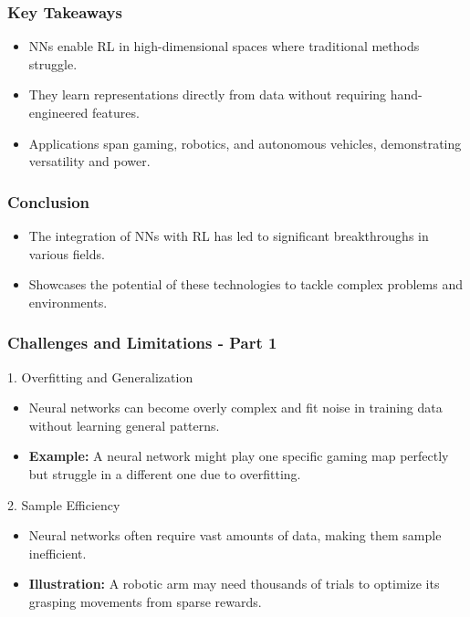 \documentclass[aspectratio=169]{beamer}
\begin{document}
\begin{frame}
    \frametitle{Key Takeaways}
    \begin{itemize}
        \item NNs enable RL in high-dimensional spaces where traditional methods struggle.
        \item They learn representations directly from data without requiring hand-engineered features.
        \item Applications span gaming, robotics, and autonomous vehicles, demonstrating versatility and power.
    \end{itemize}
\end{frame}

\begin{frame}
    \frametitle{Conclusion}
    \begin{itemize}
        \item The integration of NNs with RL has led to significant breakthroughs in various fields.
        \item Showcases the potential of these technologies to tackle complex problems and environments.
    \end{itemize}
\end{frame}

\begin{frame}[fragile]
    \frametitle{Challenges and Limitations - Part 1}
    \begin{block}{1. Overfitting and Generalization}
        \begin{itemize}
            \item Neural networks can become overly complex and fit noise in training data without learning general patterns.
            \item \textbf{Example:} A neural network might play one specific gaming map perfectly but struggle in a different one due to overfitting.
        \end{itemize}
    \end{block}
    
    \begin{block}{2. Sample Efficiency}
        \begin{itemize}
            \item Neural networks often require vast amounts of data, making them sample inefficient.
            \item \textbf{Illustration:} A robotic arm may need thousands of trials to optimize its grasping movements from sparse rewards.
        \end{itemize}
    \end{block}
\end{frame}
\end{document}
